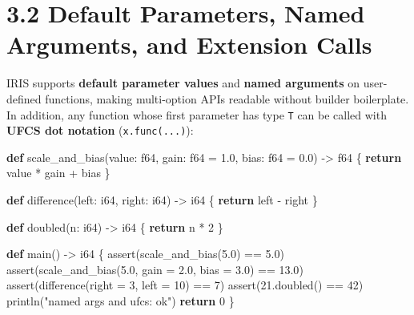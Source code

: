 \documentclass[
  english,
  oneside]{book}
\newenvironment{Shaded}{\begin{snugshade}}{\end{snugshade}}
\newcommand{\ControlFlowTok}[1]{\textcolor[rgb]{0.77,0.53,0.75}{\textbf{#1}}}
\newcommand{\DataTypeTok}[1]{\textcolor[rgb]{0.31,0.79,0.69}{#1}}
\newcommand{\DecValTok}[1]{\textcolor[rgb]{0.71,0.81,0.66}{#1}}
\newcommand{\FloatTok}[1]{\textcolor[rgb]{0.71,0.81,0.66}{#1}}
\newcommand{\FunctionTok}[1]{\textcolor[rgb]{0.86,0.86,0.67}{#1}}
\newcommand{\KeywordTok}[1]{\textcolor[rgb]{0.34,0.61,0.84}{\textbf{#1}}}
\newcommand{\NormalTok}[1]{\textcolor[rgb]{0.83,0.83,0.83}{#1}}
\newcommand{\OperatorTok}[1]{\textcolor[rgb]{0.83,0.83,0.83}{#1}}
\newcommand{\StringTok}[1]{\textcolor[rgb]{0.81,0.57,0.47}{#1}}
\begin{document}
\section{3.2 Default Parameters, Named Arguments, and Extension
Calls}\label{default-parameters-named-arguments-and-extension-calls}

IRIS supports \textbf{default parameter values} and \textbf{named
arguments} on user-defined functions, making multi-option APIs readable
without builder boilerplate. In addition, any function whose first
parameter has type \texttt{T} can be called with \textbf{UFCS dot
notation} (\texttt{x.func(...)}):

\begin{Shaded}
\begin{Highlighting}[]
\KeywordTok{def}\NormalTok{ scale\_and\_bias(value: }\DataTypeTok{f64}\NormalTok{, gain: }\DataTypeTok{f64} \OperatorTok{=} \FloatTok{1.0}\NormalTok{, bias: }\DataTypeTok{f64} \OperatorTok{=} \FloatTok{0.0}\NormalTok{) }\OperatorTok{{-}\textgreater{}} \DataTypeTok{f64}\NormalTok{ \{}
    \ControlFlowTok{return}\NormalTok{ value }\OperatorTok{*}\NormalTok{ gain }\OperatorTok{+}\NormalTok{ bias}
\NormalTok{\}}

\KeywordTok{def}\NormalTok{ difference(left: }\DataTypeTok{i64}\NormalTok{, right: }\DataTypeTok{i64}\NormalTok{) }\OperatorTok{{-}\textgreater{}} \DataTypeTok{i64}\NormalTok{ \{}
    \ControlFlowTok{return}\NormalTok{ left }\OperatorTok{{-}}\NormalTok{ right}
\NormalTok{\}}

\KeywordTok{def}\NormalTok{ doubled(n: }\DataTypeTok{i64}\NormalTok{) }\OperatorTok{{-}\textgreater{}} \DataTypeTok{i64}\NormalTok{ \{}
    \ControlFlowTok{return}\NormalTok{ n }\OperatorTok{*} \DecValTok{2}
\NormalTok{\}}

\KeywordTok{def}\NormalTok{ main() }\OperatorTok{{-}\textgreater{}} \DataTypeTok{i64}\NormalTok{ \{}
    \FunctionTok{assert}\NormalTok{(scale\_and\_bias(}\FloatTok{5.0}\NormalTok{) }\OperatorTok{==} \FloatTok{5.0}\NormalTok{)}
    \FunctionTok{assert}\NormalTok{(scale\_and\_bias(}\FloatTok{5.0}\NormalTok{, gain }\OperatorTok{=} \FloatTok{2.0}\NormalTok{, bias }\OperatorTok{=} \FloatTok{3.0}\NormalTok{) }\OperatorTok{==} \FloatTok{13.0}\NormalTok{)}
    \FunctionTok{assert}\NormalTok{(difference(right }\OperatorTok{=} \DecValTok{3}\NormalTok{, left }\OperatorTok{=} \DecValTok{10}\NormalTok{) }\OperatorTok{==} \DecValTok{7}\NormalTok{)}
    \FunctionTok{assert}\NormalTok{(}\DecValTok{21}\OperatorTok{.}\NormalTok{doubled() }\OperatorTok{==} \DecValTok{42}\NormalTok{)}
\NormalTok{    println(}\StringTok{"named args and ufcs: ok"}\NormalTok{)}
    \ControlFlowTok{return} \DecValTok{0}
\NormalTok{\}}
\end{Highlighting}
\end{Shaded}
\end{document}
